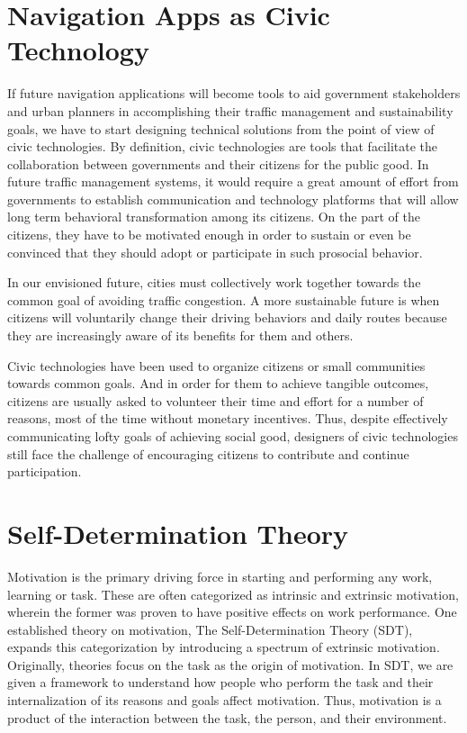 \section{Navigation Apps as Civic Technology}
If future navigation applications will become tools to aid government stakeholders and urban planners in accomplishing their traffic management and sustainability goals, we have to start designing technical solutions from the point of view of civic technologies. By definition, civic technologies are tools that facilitate the collaboration between governments and their citizens for the public good\cite{Mandarano2010Civic}. In future traffic management systems, it would require a great amount of effort from governments to establish communication and technology platforms that will allow long term behavioral transformation among its citizens. On the part of the citizens, they have to be motivated enough in order to sustain or even be convinced that they should adopt or participate in such prosocial behavior. 

In our envisioned future, cities must collectively work together towards the common goal of avoiding traffic congestion. A more sustainable future is when citizens will voluntarily change their driving behaviors and daily routes because they are increasingly aware of its benefits for them and others.

Civic technologies have been used to organize citizens or small communities towards common goals. And in order for them to achieve tangible outcomes, citizens are usually asked to volunteer their time and effort for a number of reasons, most of the time without monetary incentives. Thus, despite effectively communicating lofty goals of achieving social good, designers of civic technologies still face the challenge of encouraging citizens to contribute and continue participation. 

\section{Self-Determination Theory}
Motivation is the primary driving force in starting and performing any work, learning or task. These are often categorized as intrinsic and extrinsic motivation, wherein the former was proven to have positive effects on work performance\cite{gagne2005self}. One established theory on motivation, The Self-Determination Theory (SDT)\cite{ryan2000intrinsic}, expands this categorization by introducing a spectrum of extrinsic motivation. Originally, theories focus on the task as the origin of motivation. In SDT, we are given a framework to understand how people who perform the task and their internalization of its reasons and goals affect motivation. Thus, motivation is a product of the interaction between the task, the person, and their environment.

